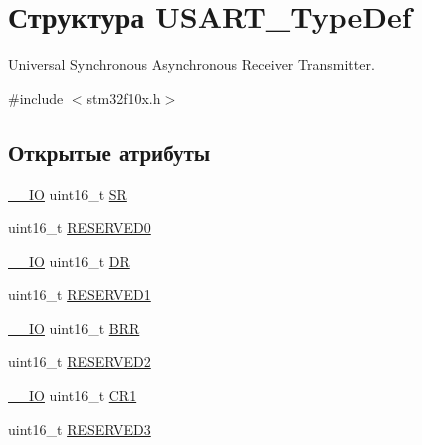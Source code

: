 \hypertarget{struct_u_s_a_r_t___type_def}{}\section{Структура U\+S\+A\+R\+T\+\_\+\+Type\+Def}
\label{struct_u_s_a_r_t___type_def}


Universal Synchronous Asynchronous Receiver Transmitter.  




{\ttfamily \#include $<$stm32f10x.\+h$>$}

\subsection*{Открытые атрибуты}
\begin{DoxyCompactItemize}
\item 
\mbox{\hyperlink{group___c_m_s_i_s___c_m3__core__definitions_gaec43007d9998a0a0e01faede4133d6be}{\+\_\+\+\_\+\+IO}} uint16\+\_\+t \mbox{\hyperlink{struct_u_s_a_r_t___type_def_a3f1fd9f0c004d3087caeba4815faa41c}{SR}}
\item 
uint16\+\_\+t \mbox{\hyperlink{struct_u_s_a_r_t___type_def_a84ccd64c74c8dbc78b94172ce759de10}{R\+E\+S\+E\+R\+V\+E\+D0}}
\item 
\mbox{\hyperlink{group___c_m_s_i_s___c_m3__core__definitions_gaec43007d9998a0a0e01faede4133d6be}{\+\_\+\+\_\+\+IO}} uint16\+\_\+t \mbox{\hyperlink{struct_u_s_a_r_t___type_def_accee34aaec89aad4aeef512bba173ae5}{DR}}
\item 
uint16\+\_\+t \mbox{\hyperlink{struct_u_s_a_r_t___type_def_a6d78680272a465db0ee43eba4e9c54f3}{R\+E\+S\+E\+R\+V\+E\+D1}}
\item 
\mbox{\hyperlink{group___c_m_s_i_s___c_m3__core__definitions_gaec43007d9998a0a0e01faede4133d6be}{\+\_\+\+\_\+\+IO}} uint16\+\_\+t \mbox{\hyperlink{struct_u_s_a_r_t___type_def_a2044eb2a0a8a731400d309741bceb2f7}{B\+RR}}
\item 
uint16\+\_\+t \mbox{\hyperlink{struct_u_s_a_r_t___type_def_af2b7924854e56d0ebd3e8699dfd0e369}{R\+E\+S\+E\+R\+V\+E\+D2}}
\item 
\mbox{\hyperlink{group___c_m_s_i_s___c_m3__core__definitions_gaec43007d9998a0a0e01faede4133d6be}{\+\_\+\+\_\+\+IO}} uint16\+\_\+t \mbox{\hyperlink{struct_u_s_a_r_t___type_def_a5de50313b1437f7f926093f00902d37a}{C\+R1}}
\item 
uint16\+\_\+t \mbox{\hyperlink{struct_u_s_a_r_t___type_def_a158066c974911c14efd7ea492ea31137}{R\+E\+S\+E\+R\+V\+E\+D3}}
\item 

\end{DoxyCompactItemize}
